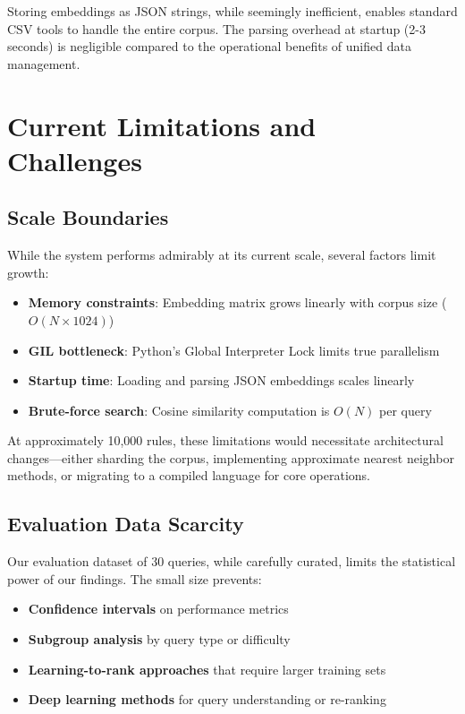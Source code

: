 Storing embeddings as JSON strings, while seemingly inefficient, enables standard CSV tools to handle the entire corpus. The parsing overhead at startup (2-3 seconds) is negligible compared to the operational benefits of unified data management.

\section{Current Limitations and Challenges}

\subsection{Scale Boundaries}

While the system performs admirably at its current scale, several factors limit growth:

\begin{itemize}[leftmargin=*,itemsep=2pt,topsep=2pt]
 \item \textbf{Memory constraints}: Embedding matrix grows linearly with corpus size ($O(N \times 1024)$)
 \item \textbf{GIL bottleneck}: Python's Global Interpreter Lock limits true parallelism
 \item \textbf{Startup time}: Loading and parsing JSON embeddings scales linearly
 \item \textbf{Brute-force search}: Cosine similarity computation is $O(N)$ per query
\end{itemize}

At approximately 10,000 rules, these limitations would necessitate architectural changes—either sharding the corpus, implementing approximate nearest neighbor methods, or migrating to a compiled language for core operations.

\subsection{Evaluation Data Scarcity}

Our evaluation dataset of 30 queries, while carefully curated, limits the statistical power of our findings. The small size prevents:

\begin{itemize}[leftmargin=*,itemsep=2pt,topsep=2pt]
 \item \textbf{Confidence intervals} on performance metrics
 \item \textbf{Subgroup analysis} by query type or difficulty
 \item \textbf{Learning-to-rank approaches} that require larger training sets
 \item \textbf{Deep learning methods} for query understanding or re-ranking
\end{itemize}

